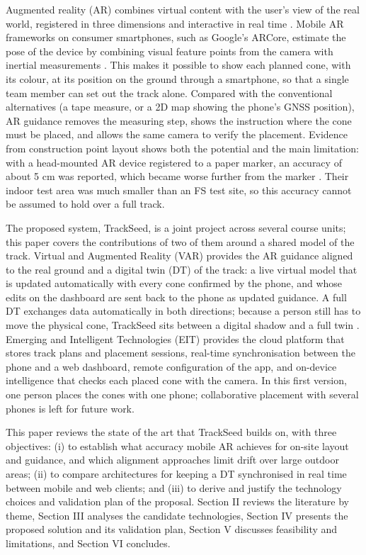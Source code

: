 Augmented reality (AR) combines virtual content with the user's view of the real world, registered in three dimensions and interactive in real time \cite{azuma1997}. Mobile AR frameworks on consumer smartphones, such as Google's ARCore, estimate the pose of the device by combining visual feature points from the camera with inertial measurements \cite{arcore}. This makes it possible to show each planned cone, with its colour, at its position on the ground through a smartphone, so that a single team member can set out the track alone. Compared with the conventional alternatives (a tape measure, or a 2D map showing the phone's GNSS position), AR guidance removes the measuring step, shows the instruction where the cone must be placed, and allows the same camera to verify the placement. Evidence from construction point layout shows both the potential and the main limitation: with a head-mounted AR device registered to a paper marker, an accuracy of about 5 cm was reported, which became worse further from the marker \cite{chalhoub2019}. Their indoor test area was much smaller than an FS test site, so this accuracy cannot be assumed to hold over a full track.

The proposed system, TrackSeed, is a joint project across several course units; this paper covers the contributions of two of them around a shared model of the track. Virtual and Augmented Reality (VAR) provides the AR guidance aligned to the real ground and a digital twin (DT) of the track: a live virtual model that is updated automatically with every cone confirmed by the phone, and whose edits on the dashboard are sent back to the phone as updated guidance. A full DT exchanges data automatically in both directions; because a person still has to move the physical cone, TrackSeed sits between a digital shadow and a full twin \cite{kritzinger2018}. Emerging and Intelligent Technologies (EIT) provides the cloud platform that stores track plans and placement sessions, real-time synchronisation between the phone and a web dashboard, remote configuration of the app, and on-device intelligence that checks each placed cone with the camera. In this first version, one person places the cones with one phone; collaborative placement with several phones is left for future work.

This paper reviews the state of the art that TrackSeed builds on, with three objectives: (i) to establish what accuracy mobile AR achieves for on-site layout and guidance, and which alignment approaches limit drift over large outdoor areas; (ii) to compare architectures for keeping a DT synchronised in real time between mobile and web clients; and (iii) to derive and justify the technology choices and validation plan of the proposal. Section II reviews the literature by theme, Section III analyses the candidate technologies, Section IV presents the proposed solution and its validation plan, Section V discusses feasibility and limitations, and Section VI concludes.

